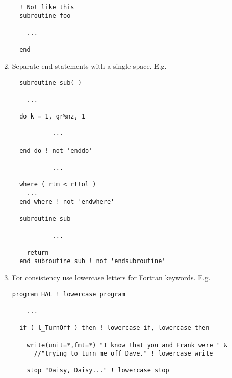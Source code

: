 \documentclass[letterpaper,12pt]{article}
\begin{document}
\begin{enumerate}
\begin{verbatim}
  ! Not like this
  subroutine foo

    ...

  end
\end{verbatim}

\item Separate end statements with a single space. \newline 
E.g.
\begin{verbatim}
  subroutine sub( )

    ...

  do k = 1, gr%nz, 1

           ...

  end do ! not 'enddo'

           ...

  where ( rtm < rttol )
    ...
  end where ! not 'endwhere'

  subroutine sub

           ...

    return
  end subroutine sub ! not 'endsubroutine'
\end{verbatim}



\item For consistency use lowercase letters for Fortran keywords. \newline
E.g.
\begin{verbatim}
program HAL ! lowercase program

    ... 

  if ( l_TurnOff ) then ! lowercase if, lowercase then

    write(unit=*,fmt=*) "I know that you and Frank were " &
      //"trying to turn me off Dave." ! lowercase write

    stop "Daisy, Daisy..." ! lowercase stop


\end{verbatim}
\end{enumerate}
\end{document}
